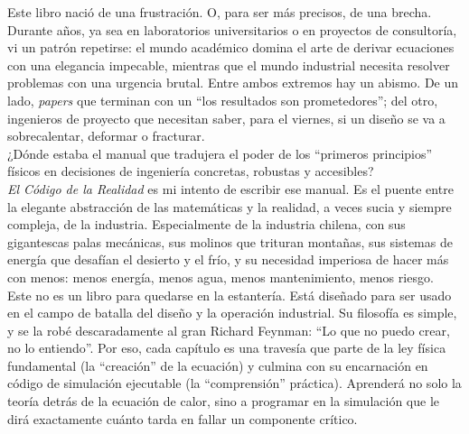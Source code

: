 \label{chap:prologo}

Este libro nació de una frustración. O, para ser más precisos, de una brecha.\\

Durante años, ya sea en laboratorios universitarios o en proyectos de consultoría, vi un patrón repetirse: el mundo académico domina el arte de derivar ecuaciones con una elegancia impecable, mientras que el mundo industrial necesita resolver problemas con una urgencia brutal. Entre ambos extremos hay un abismo. De un lado, \textit{papers} que terminan con un ``los resultados son prometedores''; del otro, ingenieros de proyecto que necesitan saber, para el viernes, si un diseño se va a sobrecalentar, deformar o fracturar.\\

¿Dónde estaba el manual que tradujera el poder de los ``primeros principios'' físicos en decisiones de ingeniería concretas, robustas y accesibles?\\

\textit{El Código de la Realidad} es mi intento de escribir ese manual. Es el puente entre la elegante abstracción de las matemáticas y la realidad, a veces sucia y siempre compleja, de la industria. Especialmente de la industria chilena, con sus gigantescas palas mecánicas, sus molinos que trituran montañas, sus sistemas de energía que desafían el desierto y el frío, y su necesidad imperiosa de hacer más con menos: menos energía, menos agua, menos mantenimiento, menos riesgo.\\

Este no es un libro para quedarse en la estantería. Está diseñado para ser usado en el campo de batalla del diseño y la operación industrial. Su filosofía es simple, y se la robé descaradamente al gran Richard Feynman: ``Lo que no puedo crear, no lo entiendo''. Por eso, cada capítulo es una travesía que parte de la ley física fundamental (la ``creación'' de la ecuación) y culmina con su encarnación en código de simulación ejecutable (la ``comprensión'' práctica). Aprenderá no solo la teoría detrás de la ecuación de calor, sino a programar en \fenics la simulación que le dirá exactamente cuánto tarda en fallar un componente crítico.\\

